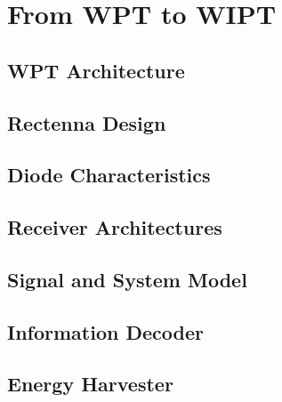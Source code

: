 \chapter{From WPT to WIPT}



\section{WPT Architecture}\label{sec:wpt-architecture}
  

\section{Rectenna Design}\label{sec:rectenna-design}
  

\section{Diode Characteristics}\label{sec:diode-characteristics}
  

\section{Receiver Architectures}\label{sec:receiver-architectures}
  

\section{Signal and System Model}\label{sec:signal-and-system-model}
  

\section{Information Decoder}\label{sec:information-decoder}
  

\section{Energy Harvester}\label{sec:energy-harvester}
   